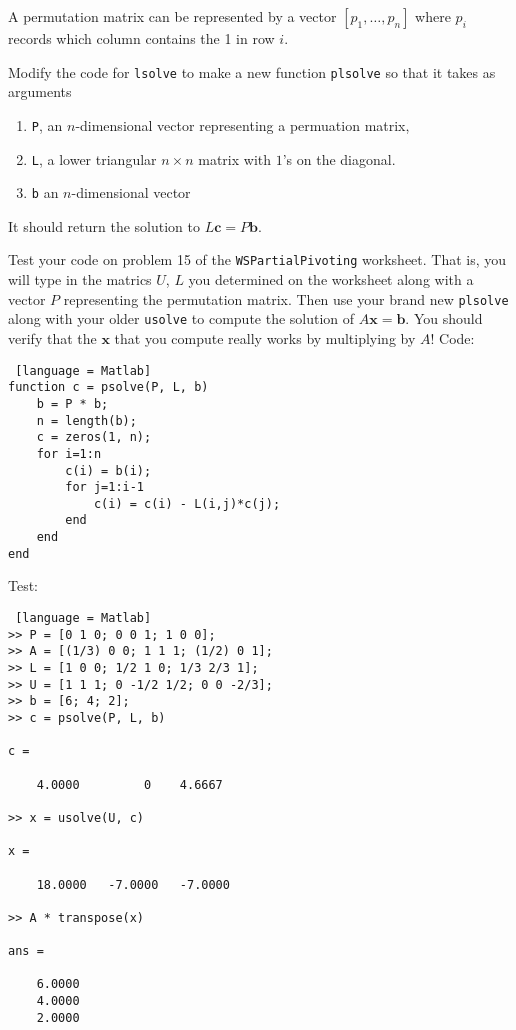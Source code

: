 \documentclass[12pt]{article}
\makeatletter
\theoremstyle{homework}
\newenvironment{exercise}[1]
{\def\@currentlabel{#1}\exercisecore}
{\endexercisecore}
\makeatother
\begin{document}
\begin{exercise}{Supplemental 4}
A permutation matrix can be represented by a vector $[p_1,\ldots,p_n]$
where $p_i$ records which column contains the 1 in row $i$.

Modify the code for {\tt lsolve} to make a new function
{\tt plsolve} so that it takes as arguments
\begin{enumerate}
\item {\tt P}, an $n$-dimensional vector representing a permuation matrix, 
\item {\tt L}, a lower triangular $n\times n$ matrix with $1$'s on the diagonal.
\item {\tt b} an $n$-dimensional vector
\end{enumerate}
It should return the solution to $L\mathbf{c} = P\mathbf{b}$.

Test your code on problem 15 of the {\tt WSPartialPivoting} worksheet.
That is, you will type in the matrics $U$, $L$ you determined on 
the worksheet along with a vector $P$ representing the permutation matrix.
Then use your brand new {\tt plsolve} along with your older {\tt usolve}
to compute the solution of $A\mathbf{x}=\mathbf{b}$.  You should verify that the $\mathbf{x}$ that you compute really works by multiplying by $A$!
\end{exercise}
Code:
\begin{lstlisting} [language = Matlab]
function c = psolve(P, L, b)
    b = P * b;
    n = length(b);
    c = zeros(1, n);
    for i=1:n
        c(i) = b(i);
        for j=1:i-1
            c(i) = c(i) - L(i,j)*c(j);
        end
    end
end
\end{lstlisting}
Test:
\begin{lstlisting} [language = Matlab]
>> P = [0 1 0; 0 0 1; 1 0 0];
>> A = [(1/3) 0 0; 1 1 1; (1/2) 0 1];
>> L = [1 0 0; 1/2 1 0; 1/3 2/3 1];
>> U = [1 1 1; 0 -1/2 1/2; 0 0 -2/3];
>> b = [6; 4; 2];
>> c = psolve(P, L, b)

c =

	4.0000         0    4.6667

>> x = usolve(U, c)

x =

	18.0000   -7.0000   -7.0000

>> A * transpose(x)

ans =

	6.0000
	4.0000
	2.0000
\end{lstlisting}
\end{document}
